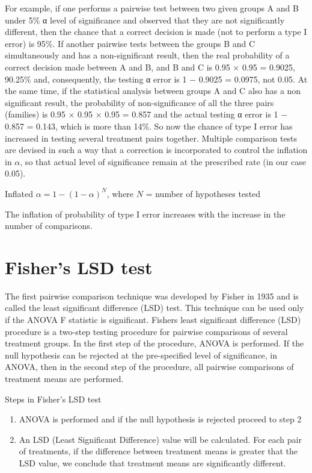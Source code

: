 \documentclass[
]{book}
\begin{document}
For example, if one performs a pairwise test between two given groups A and B under 5\% α level of significance and observed that they are not significantly different, then the chance that a correct decision is made (not to perform a type I error) is 95\%. If another pairwise tests between the groups B and C simultaneously and has a non-significant result, then the real probability of a correct decision made between A and B, and B and C is 0.95 × 0.95 = 0.9025, 90.25\% and, consequently, the testing α error is 1 − 0.9025 = 0.0975,
not 0.05. At the same time, if the statistical analysis between groups A and C also has a non significant result, the probability of non-significance of all the three pairs (families) is 0.95 × 0.95 × 0.95
= 0.857 and the actual testing α error is 1 − 0.857 = 0.143, which is more than 14\%. So now the chance of type I error has increased in testing several treatment pairs together. Multiple comparison tests are devised in such a way that a correction is incorporated to control the inflation in \(\alpha\), so that actual level of significance remain at
the prescribed rate (in our case 0.05).

Inflated \(\alpha = 1 - \left( 1 - \alpha \right)^{N}\), where \(N\) =
number of hypotheses tested

The inflation of probability of type I error increases with the increase
in the number of comparisons.

\hypertarget{lsd}{%
\section{Fisher's LSD test}\label{lsd}}

The first pairwise comparison technique was developed by Fisher in 1935 and is called the least significant difference (LSD) test. This technique can be used only if the ANOVA F statistic is significant. Fisher\textquotesingle s least significant difference (LSD) procedure is a two-step
testing procedure for pairwise comparisons of several treatment groups. In the first step of the procedure, ANOVA is performed. If the null hypothesis can be rejected at the pre-specified level of significance, in ANOVA, then in the second step of the procedure, all pairwise comparisons of treatment means are performed.

Steps in Fisher's LSD test

\begin{enumerate}
\def\labelenumi{\arabic{enumi}.}
\item
  ANOVA is performed and if the null hypothesis is rejected proceed to
  step 2
\item
  An LSD (Least Significant Difference) value will be calculated. For
  each pair of treatments, if the difference between treatment means
  is greater that the LSD value, we conclude that treatment means are
  significantly different.
\end{enumerate}
\end{document}
